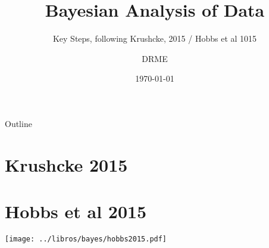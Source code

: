 \documentclass{beamer}
\begin{document}
\title{Bayesian Analysis of Data}
\subtitle{Key Steps, following Krushcke, 2015  / Hobbs et al 1015}
\author{DRME}
\date{\today}

\begin{frame}
  \titlepage
\end{frame}

\begin{frame}{Outline}
  \tableofcontents
\end{frame}

\section{Krushcke 2015}




\section{Hobbs et al 2015}

\begin{frame}
  
  \begin{center}
  \texttt{[image: ../libros/bayes/hobbs2015.pdf]}
  \end{center}
  
\end{frame}



\end{document}
